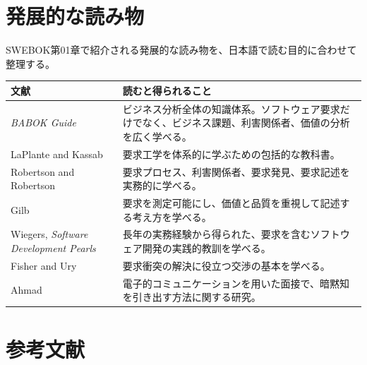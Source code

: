 \documentclass[uplatex,10pt,dvipdfmx,nomag]{jsarticle}
\begin{document}
\section{発展的な読み物}

SWEBOK第01章で紹介される発展的な読み物を、日本語で読む目的に合わせて整理する。

\begin{tabularx}{0.97\linewidth}{@{}p{.31\linewidth}X@{}}
\toprule
文献 & 読むと得られること \\
\midrule
\textit{BABOK Guide} & ビジネス分析全体の知識体系。ソフトウェア要求だけでなく、ビジネス課題、利害関係者、価値の分析を広く学べる。 \\
LaPlante and Kassab & 要求工学を体系的に学ぶための包括的な教科書。 \\
Robertson and Robertson & 要求プロセス、利害関係者、要求発見、要求記述を実務的に学べる。 \\
Gilb & 要求を測定可能にし、価値と品質を重視して記述する考え方を学べる。 \\
Wiegers, \textit{Software Development Pearls} & 長年の実務経験から得られた、要求を含むソフトウェア開発の実践的教訓を学べる。 \\
Fisher and Ury & 要求衝突の解決に役立つ交渉の基本を学べる。 \\
Ahmad & 電子的コミュニケーションを用いた面接で、暗黙知を引き出す方法に関する研究。 \\
\bottomrule
\end{tabularx}

\section{参考文献}
\end{document}
